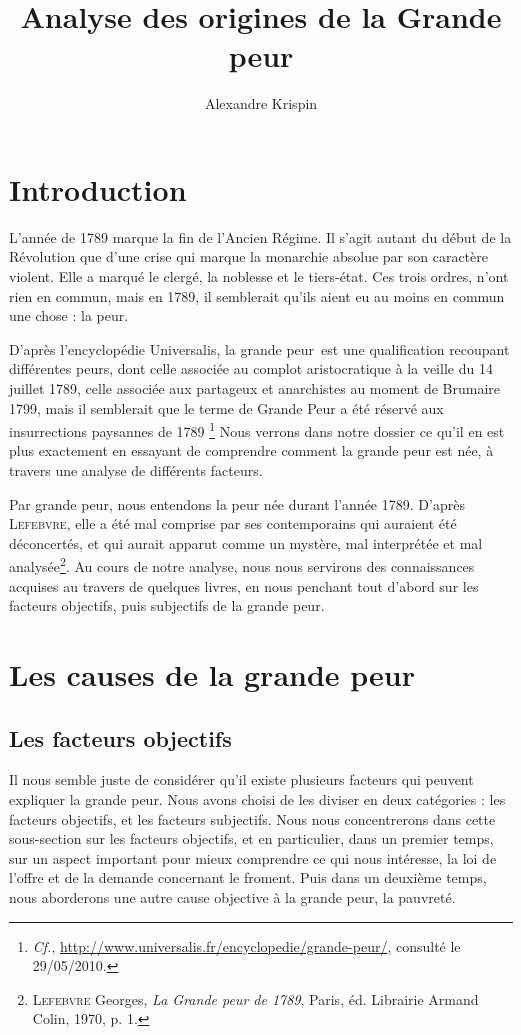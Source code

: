 \documentclass[a4paper,11pt,]{scrartcl}
\title{Analyse des origines de la Grande peur} %
\author{Alexandre Krispin} %
\begin{document}
\maketitle
\tableofcontents

\section{Introduction}

L'année de 1789 marque la fin de l'Ancien Régime. Il s'agit autant du début de la Révolution que d'une crise qui marque la monarchie absolue par son caractère violent. Elle a marqué le clergé, la noblesse et le tiers-état. Ces trois ordres, n'ont rien en commun, mais en 1789, il semblerait qu'ils aient eu au moins en commun une chose : la peur.

D'après l'encyclopédie Universalis, la \og grande peur\fg~est une qualification recoupant différentes peurs, dont celle associée au complot aristocratique à la veille du 14 juillet 1789, celle associée aux partageux et anarchistes au moment de Brumaire 1799, mais il semblerait que le terme de Grande Peur a été réservé aux insurrections paysannes de 1789 \footnote{\emph{Cf.}, \url{http://www.universalis.fr/encyclopedie/grande-peur/}, consulté le 29/05/2010.} Nous verrons dans notre dossier ce qu'il en est plus exactement en essayant de comprendre comment la grande peur est née, à travers une analyse de différents facteurs.

Par grande peur, nous entendons la peur née durant l'année 1789. D'après \textsc{Lefebvre}, elle a été mal comprise par ses contemporains qui auraient été déconcertés, et qui aurait apparut comme un mystère, mal interprétée et mal analysée\footnote{\textsc{Lefebvre} Georges, \emph{La Grande peur de 1789}, Paris, éd. Librairie Armand Colin, 1970, p. 1.}. Au cours de notre analyse, nous nous servirons des connaissances acquises au travers de quelques livres, en nous penchant tout d'abord sur les facteurs objectifs, puis subjectifs de la grande peur.
\section{Les causes de la grande peur}

\subsection{Les facteurs objectifs}

Il nous semble juste de considérer qu'il existe plusieurs facteurs qui peuvent expliquer la grande peur. Nous avons choisi de les diviser en deux catégories : les facteurs objectifs, et les facteurs subjectifs. Nous nous concentrerons dans cette sous-section sur les facteurs objectifs, et en particulier, dans un premier temps, sur un aspect important pour mieux comprendre ce qui nous intéresse, la loi de l'offre et de la demande concernant le froment. Puis dans un deuxième temps, nous aborderons une autre cause objective à la grande peur, la pauvreté.
\end{document}
